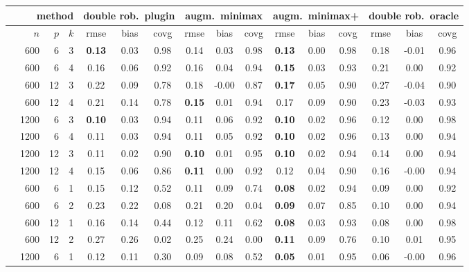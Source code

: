 
\begin{tabular}{||c|rrr||ccc|ccc|ccc|ccc||}
  \hline
\hline
& \multicolumn{3}{r||}{method} &
\multicolumn{3}{c|}{double rob.~plugin} &
\multicolumn{3}{c|}{augm.~minimax} &
\multicolumn{3}{c|}{augm.~minimax+} &
\multicolumn{3}{c||}{double rob.~oracle} \\ \hline
& $n$ & $p$ & $k$ & rmse & bias & covg & rmse & bias & covg & rmse & bias & covg & rmse & bias & covg \\ 
  \hline
\parbox[t]{2.8mm}{}
 & 600 & 6 & 3 & \bf 0.13 & 0.03 & 0.98 & 0.14 & 0.03 & 0.98 & \bf 0.13 & 0.00 & 0.98 & 0.18 & -0.01 & 0.96 \\ 
   & 600 & 6 & 4 & 0.16 & 0.06 & 0.92 & 0.16 & 0.04 & 0.94 & \bf 0.15 & 0.03 & 0.93 & 0.21 & 0.00 & 0.92 \\ 
   & 600 & 12 & 3 & 0.22 & 0.09 & 0.78 & 0.18 & -0.00 & 0.87 & \bf 0.17 & 0.05 & 0.90 & 0.27 & -0.04 & 0.90 \\ 
   & 600 & 12 & 4 & 0.21 & 0.14 & 0.78 & \bf 0.15 & 0.01 & 0.94 & 0.17 & 0.09 & 0.90 & 0.23 & -0.03 & 0.93 \\ 
   & 1200 & 6 & 3 & \bf 0.10 & 0.03 & 0.94 & 0.11 & 0.06 & 0.92 & \bf 0.10 & 0.02 & 0.96 & 0.12 & 0.00 & 0.98 \\ 
   & 1200 & 6 & 4 & 0.11 & 0.03 & 0.94 & 0.11 & 0.05 & 0.92 & \bf 0.10 & 0.02 & 0.96 & 0.13 & 0.00 & 0.94 \\ 
   & 1200 & 12 & 3 & 0.11 & 0.02 & 0.90 & \bf 0.10 & 0.01 & 0.95 & \bf 0.10 & 0.02 & 0.94 & 0.14 & 0.00 & 0.94 \\ 
   & 1200 & 12 & 4 & 0.15 & 0.06 & 0.86 & \bf 0.11 & 0.00 & 0.92 & 0.12 & 0.04 & 0.90 & 0.16 & -0.00 & 0.94 \\ 
   \hline
   \parbox[t]{2.8mm}{}
 & 600 & 6 & 1 & 0.15 & 0.12 & 0.52 & 0.11 & 0.09 & 0.74 & \bf 0.08 & 0.02 & 0.94 & 0.09 & 0.00 & 0.92 \\ 
   & 600 & 6 & 2 & 0.23 & 0.22 & 0.08 & 0.21 & 0.20 & 0.04 & \bf 0.09 & 0.07 & 0.85 & 0.10 & 0.00 & 0.94 \\ 
   & 600 & 12 & 1 & 0.16 & 0.14 & 0.44 & 0.12 & 0.11 & 0.62 & \bf 0.08 & 0.03 & 0.93 & 0.08 & 0.00 & 0.98 \\ 
   & 600 & 12 & 2 & 0.27 & 0.26 & 0.02 & 0.25 & 0.24 & 0.00 & \bf 0.11 & 0.09 & 0.76 & 0.10 & 0.01 & 0.95 \\ 
   & 1200 & 6 & 1 & 0.12 & 0.11 & 0.30 & 0.09 & 0.08 & 0.52 & \bf 0.05 & 0.01 & 0.95 & 0.06 & -0.00 & 0.96 \\ 

\end{tabular}
